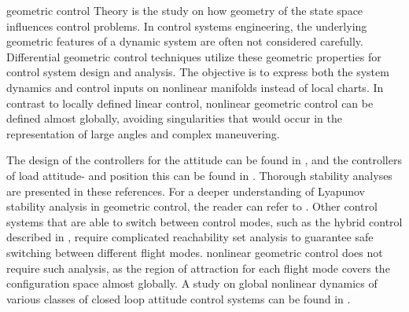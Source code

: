 geometric control Theory is the study on how geometry of the state space influences control problems. 
In control systems engineering, the underlying geometric features of a dynamic system are often not considered carefully. 
Differential geometric control techniques utilize these geometric properties for control system design and analysis.
The objective is to express both the system dynamics and control inputs on nonlinear manifolds instead of local charts. 
In contrast to locally defined linear control, nonlinear geometric control can be defined almost globally, avoiding singularities that would occur in the representation of large angles and complex maneuvering.

The design of the controllers for the  attitude can be found in \cite{Lee2010}, and the controllers of load attitude- and position this can be found in \cite{Sreenath2013c}. Thorough stability analyses are presented in these references. For a deeper understanding of Lyapunov stability analysis in geometric control, the reader can refer to \cite{Bullo2005}.
Other control systems that are able to switch between control modes, such as the hybrid control described in \cite{Gillula2010}, require complicated reachability set analysis to guarantee safe switching between different flight modes.
nonlinear geometric control does not require such analysis, as the region of attraction for each flight mode covers the configuration space almost globally. A study on global nonlinear dynamics of various classes of closed loop attitude control systems can be found in \cite{Chaturvedi2011a}. 

%
%
%
%
%
%
%

